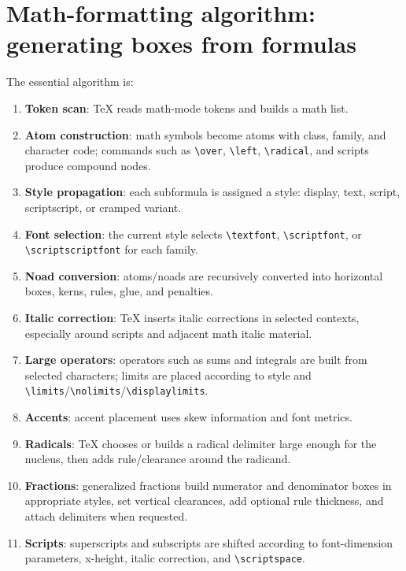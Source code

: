 \documentclass[11pt]{article}
\newcommand{\tightlist}{}
\begin{document}
\section{Math-formatting algorithm: generating boxes from formulas}\label{math-formatting-algorithm-generating-boxes-from-formulas}

The essential algorithm is:

\begin{enumerate}
\def\labelenumi{\arabic{enumi}.}
\tightlist
\item
  \textbf{Token scan}: TeX reads math-mode tokens and builds a math list.
\item
  \textbf{Atom construction}: math symbols become atoms with class, family, and character code; commands such as \texttt{\textbackslash{}over}, \texttt{\textbackslash{}left}, \texttt{\textbackslash{}radical}, and scripts produce compound nodes.
\item
  \textbf{Style propagation}: each subformula is assigned a style: display, text, script, scriptscript, or cramped variant.
\item
  \textbf{Font selection}: the current style selects \texttt{\textbackslash{}textfont}, \texttt{\textbackslash{}scriptfont}, or \texttt{\textbackslash{}scriptscriptfont} for each family.
\item
  \textbf{Noad conversion}: atoms/noads are recursively converted into horizontal boxes, kerns, rules, glue, and penalties.
\item
  \textbf{Italic correction}: TeX inserts italic corrections in selected contexts, especially around scripts and adjacent math italic material.
\item
  \textbf{Large operators}: operators such as sums and integrals are built from selected characters; limits are placed according to style and \texttt{\textbackslash{}limits}/\texttt{\textbackslash{}nolimits}/\texttt{\textbackslash{}displaylimits}.
\item
  \textbf{Accents}: accent placement uses skew information and font metrics.
\item
  \textbf{Radicals}: TeX chooses or builds a radical delimiter large enough for the nucleus, then adds rule/clearance around the radicand.
\item
  \textbf{Fractions}: generalized fractions build numerator and denominator boxes in appropriate styles, set vertical clearances, add optional rule thickness, and attach delimiters when requested.
\item
  \textbf{Scripts}: superscripts and subscripts are shifted according to font-dimension parameters, x-height, italic correction, and \texttt{\textbackslash{}scriptspace}.

\end{enumerate}
\end{document}
